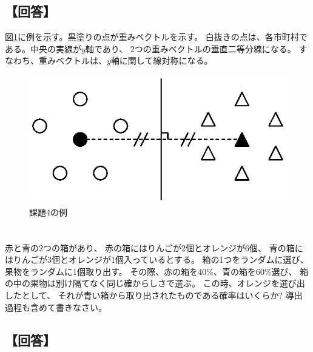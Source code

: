 \documentclass[a4j]{jarticle}
\begin{document}
\subsection{【回答】}
図\ref{fig:problem04}に例を示す。黒塗りの点が重みベクトルを示す。
白抜きの点は、各市町村である。中央の実線が$y$軸であり、
2つの重みベクトルの垂直二等分線になる。
すなわち、重みベクトルは、$y$軸に関して線対称になる。

\begin{figure}[tbp]
 \begin{center}
  \includegraphics[width=0.5\hsize]{fig/problem04.eps}
 \end{center}
 \caption{課題4の例}
 \label{fig:problem04}
\end{figure}

\section{}
赤と青の2つの箱があり、
赤の箱にはりんごが2個とオレンジが6個、
青の箱にはりんごが3個とオレンジが1個入っているとする。
箱の1つをランダムに選び、果物をランダムに1個取り出す。
その際、赤の箱を40\%、青の箱を60\%選び、
箱の中の果物は別け隔てなく同じ確からしさで選ぶ。
この時、オレンジを選び出したとして、
それが青い箱から取り出されたものである確率はいくらか?
導出過程も含めて書きなさい。

\subsection{【回答】}
\end{document}
